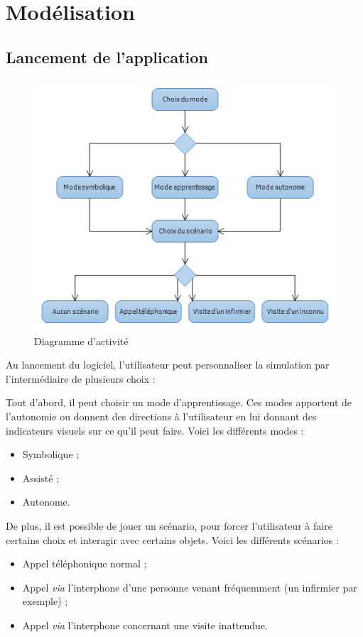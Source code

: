 \section{Modélisation}

\subsection{Lancement de l'application}
\begin{figure}[h]
\centering
\includegraphics[width=1\textwidth]{4-conception/img/diagActivite.png}
\caption{ Diagramme d'activité}
\end{figure}

Au lancement du logiciel, l'utilisateur peut personnaliser la simulation par l'intermédiaire de plusieurs choix :

Tout d'abord, il peut choisir un mode d'apprentissage. Ces modes apportent de l'autonomie ou donnent des directions à l'utilisateur en lui donnant des indicateurs visuels sur ce qu'il peut faire. Voici les différents modes :
\begin{itemize}
\item Symbolique ;
\item Assisté ;
\item Autonome.
\end{itemize}
\vspace{0.5cm}

De plus, il est possible de jouer un scénario, pour forcer l'utilisateur à faire certains choix et interagir avec certains objets. Voici les différents scénarios :
\begin{itemize}
\item Appel téléphonique normal ;
\item Appel \textit{via} l'interphone d'une personne venant fréquemment (un infirmier par exemple) ;
\item Appel \textit{via} l'interphone concernant une visite inattendue.
\end{itemize}
\vspace{0.5cm}

